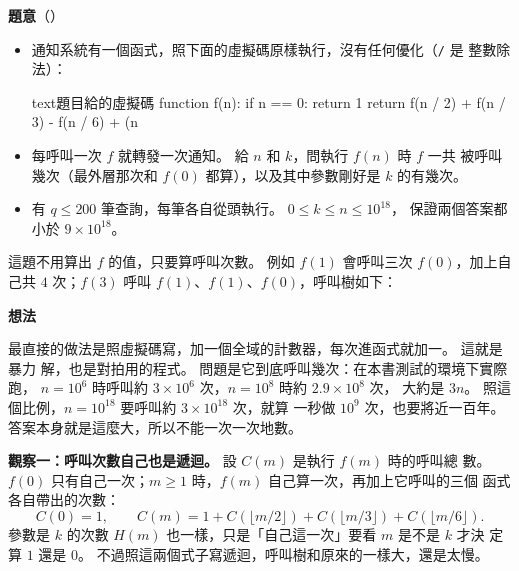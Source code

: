 \textbf{題意}（）

\begin{itemize}
\item 通知系統有一個函式，照下面的虛擬碼原樣執行，沒有任何優化（\texttt{/} 是
整數除法）：
\begin{code}{text}{題目給的虛擬碼}
function f(n):
    if n == 0:
        return 1
    return f(n / 2) + f(n / 3) - f(n / 6) + (n %
\end{code}
\item 每呼叫一次 $f$ 就轉發一次通知。 給 $n$ 和 $k$，問執行 $f(n)$ 時 $f$ 一共
被呼叫幾次（最外層那次和 $f(0)$ 都算），以及其中參數剛好是 $k$ 的有幾次。
\item 有 $q \le 200$ 筆查詢，每筆各自從頭執行。 $0 \le k \le n \le 10^{18}$，
保證兩個答案都小於 $9 \times 10^{18}$。
\end{itemize}

這題不用算出 $f$ 的值，只要算呼叫次數。 例如 $f(1)$ 會呼叫三次 $f(0)$，加上自
己共 $4$ 次；$f(3)$ 呼叫 $f(1)$、$f(1)$、$f(0)$，呼叫樹如下：

\begin{center}
\label{fig:rec-notice-tree}
\end{center}

\textbf{想法}

最直接的做法是照虛擬碼寫，加一個全域的計數器，每次進函式就加一。 這就是暴力
解，也是對拍用的程式。 問題是它到底呼叫幾次：在本書測試的環境下實際跑，
$n = 10^6$ 時呼叫約 $3 \times 10^6$ 次，$n = 10^8$ 時約 $2.9 \times 10^8$ 次，
大約是 $3n$。 照這個比例，$n = 10^{18}$ 要呼叫約 $3 \times 10^{18}$ 次，就算
一秒做 $10^9$ 次，也要將近一百年。 答案本身就是這麼大，所以不能一次一次地數。

\textbf{觀察一：呼叫次數自己也是遞迴。} 設 $C(m)$ 是執行 $f(m)$ 時的呼叫總
數。 $f(0)$ 只有自己一次；$m \ge 1$ 時，$f(m)$ 自己算一次，再加上它呼叫的三個
函式各自帶出的次數：
\[
C(0) = 1, \qquad C(m) = 1 + C(\lfloor m/2 \rfloor) + C(\lfloor m/3 \rfloor) + C(\lfloor m/6 \rfloor).
\]
參數是 $k$ 的次數 $H(m)$ 也一樣，只是「自己這一次」要看 $m$ 是不是 $k$ 才決
定算 $1$ 還是 $0$。 不過照這兩個式子寫遞迴，呼叫樹和原來的一樣大，還是太慢。

